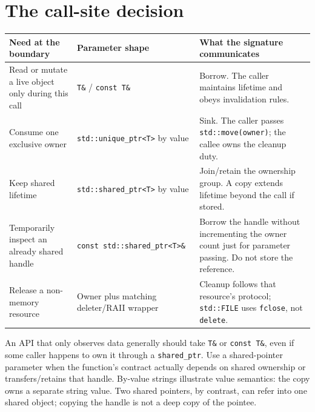 \section{The call-site decision}\label{01-foundations-i-ch003-the-call-site-decision}

{\def\LTcaptype{none} %
\begin{longtable}[]{@{}
  >{\raggedright\arraybackslash}p{}
  >{\raggedright\arraybackslash}p{}
  >{\raggedright\arraybackslash}p{}@{}}
\toprule\noalign{}
\begin{minipage}[b]{\linewidth}\raggedright
Need at the boundary
\end{minipage} & \begin{minipage}[b]{\linewidth}\raggedright
Parameter shape
\end{minipage} & \begin{minipage}[b]{\linewidth}\raggedright
What the signature communicates
\end{minipage} \\
\midrule\noalign{}
\endhead
\bottomrule\noalign{}
\endlastfoot
Read or mutate a live object only during this call & \texttt{T\&} / \texttt{const\ T\&} & Borrow. The caller maintains lifetime and obeys invalidation rules. \\
Consume one exclusive owner & \texttt{std::unique\_ptr\textless{}T\textgreater{}} by value & Sink. The caller passes \texttt{std::move(owner)}; the callee owns the cleanup duty. \\
Keep shared lifetime & \texttt{std::shared\_ptr\textless{}T\textgreater{}} by value & Join/retain the ownership group. A copy extends lifetime beyond the call if stored. \\
Temporarily inspect an already shared handle & \texttt{const\ std::shared\_ptr\textless{}T\textgreater{}\&} & Borrow the handle without incrementing the owner count just for parameter passing. Do not store the reference. \\
Release a non-memory resource & Owner plus matching deleter/RAII wrapper & Cleanup follows that resource's protocol; \texttt{std::FILE} uses \texttt{fclose}, not \texttt{delete}. \\
\end{longtable}
}

An API that only observes data generally should take \texttt{T\&} or \texttt{const\ T\&}, even if some caller happens to own it through a \texttt{shared\_ptr}. Use a shared-pointer parameter when the function's contract actually depends on shared ownership or transfers/retains that handle. By-value strings illustrate value semantics: the copy owns a separate string value. Two shared pointers, by contrast, can refer into one shared object; copying the handle is not a deep copy of the pointee.

